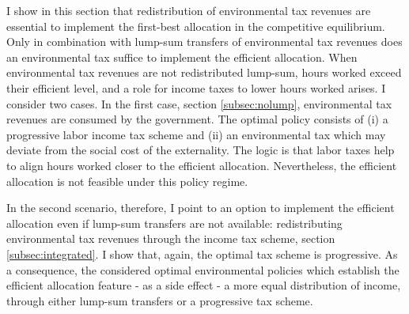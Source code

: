 I show in this section that redistribution of environmental tax revenues are essential to implement the first-best allocation in the competitive equilibrium. Only in combination with lump-sum transfers of  environmental tax revenues does an environmental tax suffice to implement the efficient allocation. %
When environmental tax revenues are not redistributed lump-sum, hours worked exceed their efficient level, and a role for income taxes to lower hours worked arises. I consider two cases.
In the first case, section \ref{subsec:nolump}, environmental tax revenues are consumed by the government. The optimal policy consists of (i) a progressive labor income tax scheme and (ii) an environmental tax which may deviate from the social cost of the externality. The logic is that labor taxes help to align hours worked closer to the efficient allocation. 
Nevertheless, the efficient allocation is not feasible under this policy regime.

In the second scenario, therefore, I point to an option to implement the efficient allocation even if lump-sum transfers are not available: redistributing environmental tax revenues through the income tax scheme, section \ref{subsec:integrated}.
 I show that, again, the optimal tax scheme is progressive. 
As a consequence, the considered optimal environmental policies which establish the efficient allocation feature - as a side effect - a more equal distribution of income, through either lump-sum transfers or a progressive tax scheme.%


